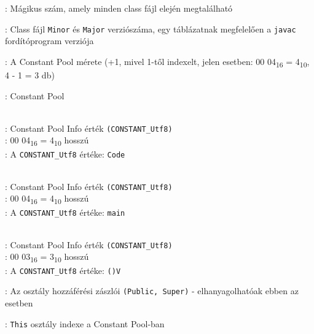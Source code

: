 \begin{compactitem}
\setlength\itemsep{-5px}
\item {}: Mágikus szám, amely minden class fájl elején megtalálható
\item {} : Class fájl \lstinline{Minor} és \lstinline{Major} verziószáma, egy táblázatnak megfelelően a \lstinline{javac} fordítóprogram verziója
\item {}: A Constant Pool mérete (+1, mivel 1-től indexelt, jelen esetben: 00 04\textsubscript{16} = 4\textsubscript{10}, 4 - 1 = 3 db)
\item {}: Constant Pool
\begin{compactitem}
    \setlength\itemsep{-5px}
    \item {}   \\
    : Constant Pool Info érték \lstinline{(CONSTANT_Utf8)} \\
    : 00 04\textsubscript{16} = 4\textsubscript{10} hosszú \\
    : A \lstinline{CONSTANT_Utf8} értéke: \lstinline{Code}
    \item {}   \\
    : Constant Pool Info érték \lstinline{(CONSTANT_Utf8)} \\
    : 00 04\textsubscript{16} = 4\textsubscript{10} hosszú \\
    : A \lstinline{CONSTANT_Utf8} értéke: \lstinline{main}
    \item {}   \\
    : Constant Pool Info érték \lstinline{(CONSTANT_Utf8)} \\
    : 00 03\textsubscript{16} = 3\textsubscript{10} hosszú \\
    : A \lstinline{CONSTANT_Utf8} értéke: \lstinline{()V}
\end{compactitem}
\item {}: Az osztály hozzáférési zászlói \lstinline{(Public, Super)} - elhanyagolhatóak ebben az esetben
\item {}: \lstinline{This} osztály indexe a Constant Pool-ban

\end{compactitem}
